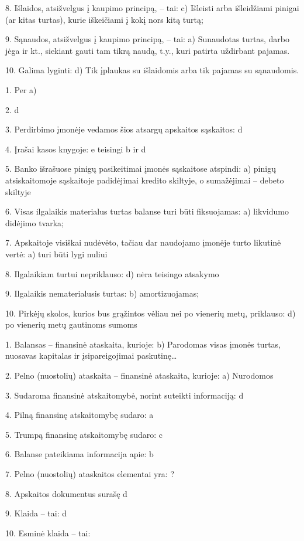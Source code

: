 8. Išlaidos, atsižvelgus į kaupimo principą, – tai:
c) Išleisti arba išleidžiami pinigai (ar kitas turtas), kurie iškeičiami
į kokį nors kitą turtą;

9. Sąnaudos, atsižvelgus į kaupimo principą, – tai:
a) Sunaudotas turtas, darbo jėga ir kt., siekiant gauti tam tikrą naudą,
t.y., kuri patirta uždirbant pajamas.

10. Galima lyginti:
d)  Tik įplaukas su išlaidomis arba tik pajamas su sąnaudomis.

1. Per
a)

2. 
d

3. Perdirbimo įmonėje vedamos šios atsargų apskaitos sąskaitos:
d

4. Įrašai kasos knygoje:
e  teisingi b ir d

5. Banko išrašuose pinigų pasikeitimai įmonės sąskaitose atspindi:
a) pinigų atsiskaitomoje sąskaitoje padidėjimai kredito skiltyje, o
sumažėjimai – debeto skiltyje

6. Visas ilgalaikis materialus turtas balanse turi būti fiksuojamas:
a) likvidumo didėjimo tvarka;

7. Apskaitoje visiškai nudėvėto, tačiau dar naudojamo įmonėje turto
likutinė vertė:
a) turi būti lygi nuliui

8. Ilgalaikiam turtui nepriklauso:
d) nėra teisingo atsakymo

9. Ilgalaikis nematerialusis turtas:
b) amortizuojamas;

10. Pirkėjų skolos, kurios bus grąžintos vėliau nei po vienerių metų,
priklauso:
d) po vienerių metų gautinoms sumoms


1. Balansas – finansinė ataskaita, kurioje:
b) Parodomas visas įmonės turtas, nuosavas kapitalas ir
įsipareigojimai paskutinę…

2. Pelno (nuostolių) ataskaita – finansinė ataskaita, kurioje:
a) Nurodomos

3. Sudaroma finansinė atskaitomybė, norint suteikti informaciją:
d

4. Pilną finansinę atskaitomybę sudaro:
a

5. Trumpą finansinę atskaitomybę sudaro:
c

6. Balanse pateikiama informacija apie:
b

7. Pelno (nuostolių) ataskaitos elementai yra:
?

8. Apskaitos dokumentus surašę
d

9. Klaida – tai:
d

10. Esminė klaida – tai:
